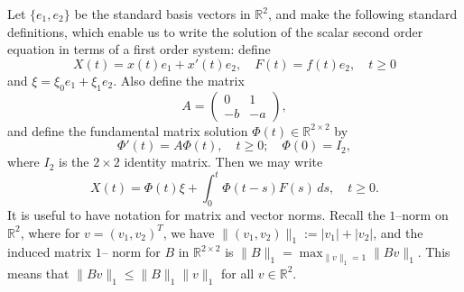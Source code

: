 \documentclass[10pt,reqno]{amsart}
\theoremstyle{definition}
\begin{document}
	Let $\{e_1,e_2\}$ be the standard basis vectors in $\mathbb{R}^2$, and make the following standard definitions, which enable us to write the solution of the scalar second order equation in terms of a first order system: define
	\[
	X(t)= x(t)e_1+x'(t)e_2, \quad 
	F(t)=f(t)e_2, \quad t\geq 0
	\] 
	and $\xi=\xi_0 e_1+\xi_1 e_2$. Also define the matrix
	\[
	A=\left(\begin{matrix}
		0 & 1 \\
		-b & -a
	\end{matrix}\right),
	\]
	and define the fundamental matrix solution $\Phi(t)\in \mathbb{R}^{2\times 2}$ by 
	\begin{equation} \label{eq.Phi}
	\Phi'(t)= A \Phi(t), \quad t\geq 0; \quad \Phi(0)=I_2,
	\end{equation}
	where $I_2$ is the $2\times 2$ identity matrix. Then we may write 
	\[
	X(t)=\Phi(t)\xi + \int_0^t \Phi(t-s)F(s)\,ds, \quad t\geq 0.
	\] 
	It is useful to have notation for matrix and vector norms. Recall the $1$--norm on $\mathbb{R}^2$, where for  $v=(v_1,v_2)^T$, we have  $\|(v_1,v_2)\|_1:=|v_1|+|v_2|$, and the induced matrix $1$-- norm for $B$ in $\mathbb{R}^{2\times 2}$ is  $\|B\|_1=\max_{\|v\|_1=1}\|Bv\|_1$. This means that $\|Bv\|_1\leq \|B\|_1\|v\|_1$ for all $v\in \mathbb{R}^2$. 
	
\end{document}
